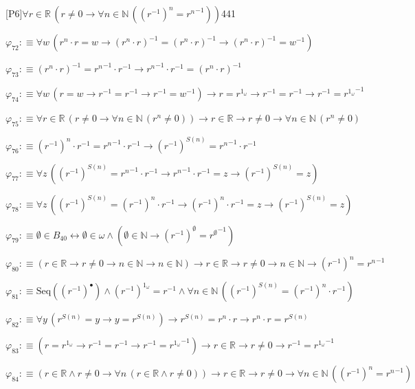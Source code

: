 \begin{fullproof}{[P6]}{$\forall r \in \mathbb{R}\,(r \neq 0 \to \forall n \in \mathbb{N}\,({{(r^{-1})}^{n}} = {{r}^{n}}^{-1}))$}{441}
\begin{abbrevlist}
\item $\varphi_{72} :\equiv \forall w\,({{r}^{n}} \cdot r = w \to ({{r}^{n}} \cdot r)^{-1} = ({{r}^{n}} \cdot r)^{-1} \to ({{r}^{n}} \cdot r)^{-1} = w^{-1})$
\item $\varphi_{73} :\equiv ({{r}^{n}} \cdot r)^{-1} = {{r}^{n}}^{-1} \cdot r^{-1} \to {{r}^{n}}^{-1} \cdot r^{-1} = ({{r}^{n}} \cdot r)^{-1}$
\item $\varphi_{74} :\equiv \forall w\,(r = w \to r^{-1} = r^{-1} \to r^{-1} = w^{-1}) \to r = {{r}^{1_{\omega}}} \to r^{-1} = r^{-1} \to r^{-1} = {{r}^{1_{\omega}}}^{-1}$
\item $\varphi_{75} :\equiv \forall r \in \mathbb{R}\,(r \neq 0 \to \forall n \in \mathbb{N}\,({{r}^{n}} \neq 0)) \to r \in \mathbb{R} \to r \neq 0 \to \forall n \in \mathbb{N}\,({{r}^{n}} \neq 0)$
\item $\varphi_{76} :\equiv {{(r^{-1})}^{n}} \cdot r^{-1} = {{r}^{n}}^{-1} \cdot r^{-1} \to {{(r^{-1})}^{S(n)}} = {{r}^{n}}^{-1} \cdot r^{-1}$
\item $\varphi_{77} :\equiv \forall z\,({{(r^{-1})}^{S(n)}} = {{r}^{n}}^{-1} \cdot r^{-1} \to {{r}^{n}}^{-1} \cdot r^{-1} = z \to {{(r^{-1})}^{S(n)}} = z)$
\item $\varphi_{78} :\equiv \forall z\,({{(r^{-1})}^{S(n)}} = {{(r^{-1})}^{n}} \cdot r^{-1} \to {{(r^{-1})}^{n}} \cdot r^{-1} = z \to {{(r^{-1})}^{S(n)}} = z)$
\item $\varphi_{79} :\equiv \emptyset \in B_{40} \leftrightarrow \emptyset \in \omega \land (\emptyset \in \mathbb{N} \to {{(r^{-1})}^{\emptyset}} = {{r}^{\emptyset}}^{-1})$
\item $\varphi_{80} :\equiv (r \in \mathbb{R} \to r \neq 0 \to n \in \mathbb{N} \to n \in \mathbb{N}) \to r \in \mathbb{R} \to r \neq 0 \to n \in \mathbb{N} \to {{(r^{-1})}^{n}} = {{r}^{n}}^{-1}$
\item $\varphi_{81} :\equiv \mathrm{Seq}({(r^{-1})^{\bullet}}) \land {{(r^{-1})}^{1_{\omega}}} = r^{-1} \land \forall n \in \mathbb{N}\,({{(r^{-1})}^{S(n)}} = {{(r^{-1})}^{n}} \cdot r^{-1})$
\item $\varphi_{82} :\equiv \forall y\,({{r}^{S(n)}} = y \to y = {{r}^{S(n)}}) \to {{r}^{S(n)}} = {{r}^{n}} \cdot r \to {{r}^{n}} \cdot r = {{r}^{S(n)}}$
\item $\varphi_{83} :\equiv (r = {{r}^{1_{\omega}}} \to r^{-1} = r^{-1} \to r^{-1} = {{r}^{1_{\omega}}}^{-1}) \to r \in \mathbb{R} \to r \neq 0 \to r^{-1} = {{r}^{1_{\omega}}}^{-1}$
\item $\varphi_{84} :\equiv (r \in \mathbb{R} \land r \neq 0 \to \forall n\,(r \in \mathbb{R} \land r \neq 0)) \to r \in \mathbb{R} \to r \neq 0 \to \forall n \in \mathbb{N}\,({{(r^{-1})}^{n}} = {{r}^{n}}^{-1})$

\end{abbrevlist}
\end{fullproof}
